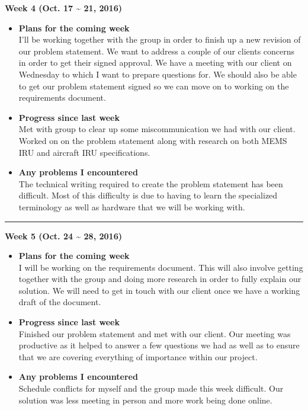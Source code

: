 		\begin{center}
			\textbf{Week 4 (Oct. 17 {\textasciitilde{}} 21, 2016)}
		\end{center}
		\begin{itemize}
			\item \textbf{Plans for the coming week}
			\\ I'll be working together with the group in order to finish up a new revision of our problem statement. We want to address a couple of our clients concerns in order to get their signed approval. We have a meeting with our client on Wednesday to which I want to prepare questions for. We should also be able to get our problem statement signed so we can move on to working on the requirements document.\\

			\item \textbf{Progress since last week}
			\\Met with group to clear up some miscommunication we had with our client. Worked on on the problem statement along with research on both MEMS IRU and aircraft IRU specifications.\\

			\item \textbf{Any problems I encountered}
			\\The technical writing required to create the problem statement has been difficult. Most of this difficulty is due to having to learn the specialized terminology as well as hardware that we will be working with.\\
		\end{itemize}

		\rule{\textwidth}{0.5pt}

		\begin{center}
			\textbf{Week 5 (Oct. 24 {\textasciitilde{}} 28, 2016)}
		\end{center}
		\begin{itemize}
			\item \textbf{Plans for the coming week}
			\\ I will be working on the requirements document. This will also involve getting together with the group and doing more research in order to fully explain our solution. We will need to get in touch with our client once we have a working draft of the document.\\

			\item \textbf{Progress since last week}
			\\Finished our problem statement and met with our client. Our meeting was productive as it helped to answer a few questions we had as well as to ensure that we are covering everything of importance within our project.\\

			\item \textbf{Any problems I encountered}
			\\Schedule conflicts for myself and the group made this week difficult. Our solution was less meeting in person and more work being done online.\\
		\end{itemize}

